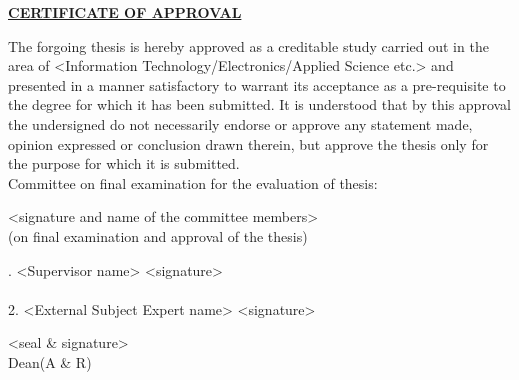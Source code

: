 \begin{center}
{\underline{\bf\Large CERTIFICATE OF APPROVAL }}\\
\par\vspace{5mm}
\end{center}
\noindent The forgoing thesis is hereby approved as a creditable study carried out in the area of <Information
Technology/Electronics/Applied Science etc.> and presented in a manner satisfactory to warrant its
acceptance as a pre-requisite to the degree for which it has been submitted. It is understood that by this approval the undersigned do not necessarily endorse or approve any statement made, opinion expressed or conclusion drawn therein, but approve the thesis only for the purpose for which it is submitted.\\
\vspace{15mm}
\noindent Committee on final examination for the evaluation of thesis:

<signature and name of the committee members>\\
(on final examination and approval of the thesis)\\
\vspace{35mm}

. <Supervisor name>   <signature> \\
\\
2. <External Subject Expert name>    <signature>
\\
\vspace{35mm}
\begin{flushright}
    <seal \& signature>\\
    Dean(A \& R)
\end{flushright}